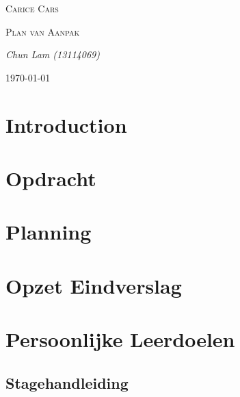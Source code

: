 \documentclass[]{report}
\begin{document}
\begin{titlepage}
\centering
\par\vspace{1cm}
{\scshape\LARGE Carice Cars \par}
\vspace{3cm}
{\scshape\Large Plan van Aanpak  \par}
\vspace{0.5cm}
\vfill
{\Large\itshape Chun Lam (13114069)\par}

\vspace{1cm}
{\large \today\par}
\end{titlepage}
\newpage

%



\tableofcontents
\newpage

\chapter{Introduction}
\label{introduction}


\chapter{Opdracht}
\label{ch:opdracht}


\chapter{Planning}
\label{ch:planning}


\chapter{Opzet Eindverslag}
\label{ch:eindverslag}


\chapter{Persoonlijke Leerdoelen}
\label{ch:leerdoelen}


\begin{thebibliography}{9}


\end{thebibliography}

\begin{appendix}
\chapter{Stagehandleiding}
\label{app:handleiding}


\end{appendix}
\end{document}
